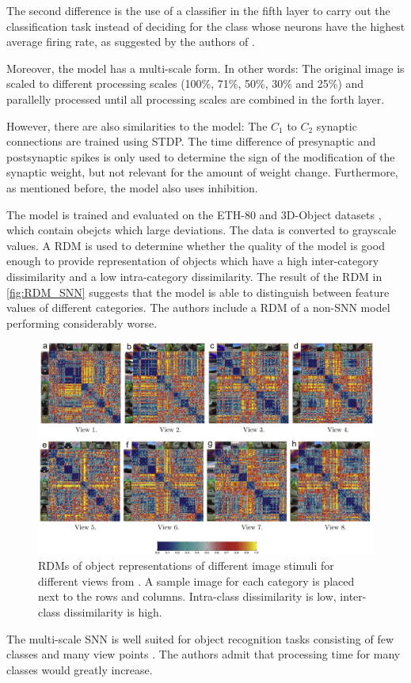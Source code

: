 The second difference is the use of a classifier in the fifth layer to carry out the classification task instead of deciding for the class whose neurons have the highest average firing rate, 
as suggested by the authors of \cite{SNN}.

Moreover, the model has a multi-scale form.
In other words: 
The original image is scaled to different processing scales (100\%, 71\%, 50\%, 30\% and 25\%) and parallelly processed until all processing scales are combined in the forth layer.

However, there are also similarities to the \cite{SNN} model:
The $C_1$ to $C_2$ synaptic connections are trained using \ac{STDP}.
The time difference of presynaptic and postsynaptic spikes is only used to determine the sign of the modification of the synaptic weight, but not relevant for the amount of weight change.
Furthermore, as mentioned before, the \cite{multi_scale_STDP} model also uses inhibition.

The model is trained and evaluated on the ETH-80 and 3D-Object datasets \cite{multi_scale_STDP}, which contain obejcts which large deviations.
The data is converted to grayscale values.
A \ac{RDM} is used to determine whether the quality of the model is good enough to provide representation of objects which have a high inter-category dissimilarity and a low intra-category dissimilarity.
The result of the \ac{RDM} in \autoref{fig:RDM_SNN} suggests that the model is able to distinguish between feature values of different categories.
The authors include a \ac{RDM} of a non-\ac{SNN} model performing considerably worse.

\begin{figure}[htbp]
    \center
    \includegraphics[width=\textwidth]{pictures/inter_intra_category_dissimilarity.jpg}
    \caption{\acp{RDM} of object representations of different image stimuli for different views from \cite{multi_scale_STDP}.
    A sample image for each category is placed next to the rows and columns.
    Intra-class dissimilarity is low, inter-class dissimilarity is high.}
    \label{fig:RDM_SNN}
\end{figure}

The multi-scale \ac{SNN} is well suited for object recognition tasks consisting of few classes and many view points \cite{multi_scale_STDP}.
The authors admit that processing time for many classes would greatly increase.
